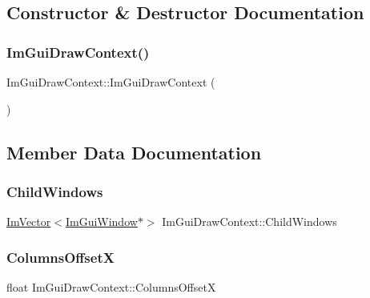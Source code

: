 \subsection{Constructor \& Destructor Documentation}
\hypertarget{struct_im_gui_draw_context_a0bd8a456860aee49497c58c82a01600c}{}\label{struct_im_gui_draw_context_a0bd8a456860aee49497c58c82a01600c} 
\subsubsection{\texorpdfstring{Im\+Gui\+Draw\+Context()}{ImGuiDrawContext()}}
{\footnotesize\ttfamily Im\+Gui\+Draw\+Context\+::\+Im\+Gui\+Draw\+Context (\begin{DoxyParamCaption}{ }\end{DoxyParamCaption})}



\subsection{Member Data Documentation}
\hypertarget{struct_im_gui_draw_context_a70dc80b69c2a4e5fae4009300fe525a5}{}\label{struct_im_gui_draw_context_a70dc80b69c2a4e5fae4009300fe525a5} 
\subsubsection{\texorpdfstring{Child\+Windows}{ChildWindows}}
{\footnotesize\ttfamily \hyperlink{class_im_vector}{Im\+Vector}$<$\hyperlink{struct_im_gui_window}{Im\+Gui\+Window}$\ast$$>$ Im\+Gui\+Draw\+Context\+::\+Child\+Windows}

\hypertarget{struct_im_gui_draw_context_af8be098e7ddd1885343725f3fd61ce4a}{}\label{struct_im_gui_draw_context_af8be098e7ddd1885343725f3fd61ce4a} 
\subsubsection{\texorpdfstring{Columns\+OffsetX}{ColumnsOffsetX}}
{\footnotesize\ttfamily float Im\+Gui\+Draw\+Context\+::\+Columns\+OffsetX}

